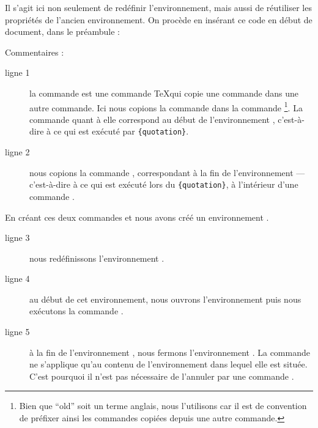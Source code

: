 Il s'agit ici non seulement de redéfinir l'environnement, mais aussi de réutiliser les propriétés de l'ancien environnement. On procède en insérant ce code en début de document, dans le préambule :

\begin{latexcode}
\let\oldquotation\quotation
\let\endoldquotation\endquotation
\renewenvironment{quotation}
    {\begin{oldquotation}\singlespace}
        {\end{oldquotation}}
\end{latexcode}

Commentaires : 

\begin{description}
\item[ligne 1]la commande  est une commande \TeX qui copie une commande dans une autre commande. Ici nous copions la commande  dans la commande \footnote{Bien que \enquote{old} soit un terme anglais, nous l'utilisons car il est de convention de préfixer ainsi les commandes copiées depuis une autre commande.}. La commande  quant à elle correspond au début de l'environnement , c'est-à-dire à ce qui est exécuté par \verb|{quotation}|.
\item[ligne 2]nous copions la commande , correspondant à la fin de l'environnement   --- c'est-à-dire à ce qui est exécuté lors du \verb|{quotation}|, à l'intérieur d'une commande .
\end{description}

En créant ces deux commandes  et  nous avons créé un environnement .

\begin{description}
\item[ligne 3]nous redéfinissons l'environnement .
\item[ligne 4]au début de cet environnement, nous ouvrons l'environnement  puis nous exécutons la commande .
\item[ligne 5]à la fin de l'environnement , nous fermons l'environnement . La commande  ne s'applique qu'au contenu de l'environnement dans lequel elle est située. C'est pourquoi il n'est pas nécessaire de l'annuler par une commande . 
\end{description}

